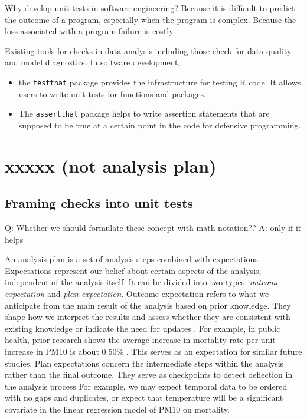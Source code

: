 \documentclass[
]{jds}
\providecommand{\tightlist}{%
  \setlength{\itemsep}{0pt}\setlength{\parskip}{0pt}}\usepackage{longtable,booktabs,array}
\begin{document}
Why develop unit tests in software engineering? Because it is difficult
to predict the outcome of a program, especially when the program is
complex. Because the loss associated with a program failure is costly.

Existing tools for checks in data analysis including those check for
data quality and model diagnostics. In software development,

\begin{itemize}
\tightlist
\item
  the \texttt{testthat} package \citep{testthat} provides the
  infrastructure for testing R code. It allows users to write unit tests
  for functions and packages.
\item
  The \texttt{assertthat} package \citep{assertthat} helps to write
  assertion statements that are supposed to be true at a certain point
  in the code for defensive programming.
\end{itemize}

\section{xxxxx (not analysis plan)}\label{sec-plan}

\subsection{Framing checks into unit
tests}\label{framing-checks-into-unit-tests}

Q: Whether we should formulate these concept with math notation?? A:
only if it helps

An analysis plan is a set of analysis steps combined with expectations.
Expectations represent our belief about certain aspects of the analysis,
independent of the analysis itself. It can be divided into two types:
\emph{outcome expectation} and \emph{plan expectation}. Outcome
expectation refers to what we anticipate from the main result of the
analysis based on prior knowledge. They shape how we interpret the
results and assess whether they are consistent with existing knowledge
or indicate the need for updates \citep{grolemund_cognitive_2014}. For
example, in public health, prior research shows the average increase in
mortality rate per unit increase in PM10 is about 0.50\%
\citep{liu2019ambient}. This serves as an expectation for similar future
studies. Plan expectations concern the intermediate steps within the
analysis rather than the final outcome. They serve as checkpoints to
detect deflection in the analysis process For example, we may expect
temporal data to be ordered with no gaps and duplicates, or expect that
temperature will be a significant covariate in the linear regression
model of PM10 on mortality.
\end{document}
